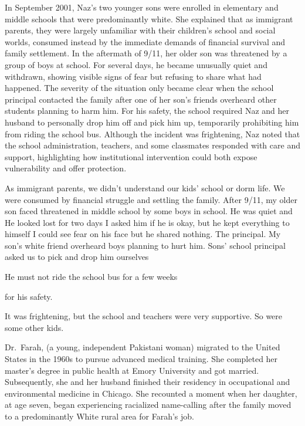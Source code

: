 In September 2001, Naz's two younger sons were enrolled in elementary and middle schools that were predominantly white. She explained that as immigrant parents, they were largely unfamiliar with their children’s school and social worlds, consumed instead by the immediate demands of financial survival and family settlement. In the aftermath of 9/11, her older son was threatened by a group of boys at school. For several days, he became unusually quiet and withdrawn, showing visible signs of fear but refusing to share what had happened. The severity of the situation only became clear when the school principal contacted the family after one of her son’s friends overheard other students planning to harm him. For his safety, the school required Naz and her husband to personally drop him off and pick him up, temporarily prohibiting him from riding the school bus. Although the incident was frightening, Naz noted that the school administration, teachers, and some classmates responded with care and support, highlighting how institutional intervention could both expose vulnerability and offer protection.

\begin{FoundPoem}
As immigrant parents, we didn’t understand our kids’ school or dorm life. We
were consumed by financial struggle and settling the family. After 9/11, my
older son faced threatened in middle school by some boys in school. He was
quiet and He looked lost for two days
 I asked him if he is okay, but he kept everything to himself                I could see
 fear on his face but he shared nothing.
 		 The principal. My son’s white friend overheard boys planning to
 hurt him. Sons’ school principal asked us to pick and drop him   ourselves  

 He must not ride the school bus for a few weeks 

 for his safety. 

It was frightening, but the school and teachers were very supportive. So were
some other kids. 
\end{FoundPoem}

Dr.~Farah, (a young, independent Pakistani woman) migrated to the United States in the 1960s to pursue advanced medical training. She completed her master’s degree in public health at Emory University and got married. Subsequently, she and her husband finished their residency in occupational and environmental medicine in Chicago. She recounted a moment when her daughter, at age seven, began experiencing racialized name-calling after the family moved to a predominantly White rural area for Farah’s job.


